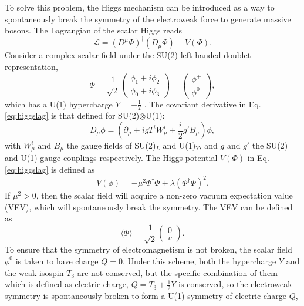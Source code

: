 \documentclass[a4paper,12pt]{article}
\begin{document}
To solve this problem, the Higgs mechanism can be introduced as a way to spontaneously break the symmetry of the electroweak force to generate massive bosons. 
The Lagrangian of the scalar Higgs reads
\begin{equation}
    \label{eq:higgslag}
    \mathcal{L} = (D^\mu\Phi)^\dagger(D_\mu\Phi) - V(\Phi).
\end{equation}
Consider a complex scalar field under the SU(2) left-handed doublet representation,
\begin{equation}
    \label{eq:doubscal}
    \Phi = \frac{1}{\sqrt{2}}\begin{pmatrix}\phi_1+i\phi_2\\\phi_0+i\phi_3\end{pmatrix} = \begin{pmatrix} \phi^+\\\phi^0\end{pmatrix},
\end{equation}
which has a U(1) hypercharge $Y=+\frac12$ \cite{l}.
The covariant derivative in Eq.\eqref{eq:higgslag} is that defined for SU(2)$\otimes$U(1):
\begin{equation}
    \label{eq:covarhiggs}
    D_\mu\phi = \left(\partial_\mu + igT^iW_\mu^i + \frac{i}{2}g'B_\mu\right)\phi,
\end{equation}
with $W^i_\mu$ and $B_\mu$ the gauge fields of SU(2)$_L$ and U(1)$_Y$, and $g$ and $g'$ the SU(2) and U(1) gauge couplings respectively. 
The Higgs potential $V(\Phi)$ in Eq.\eqref{eq:higgslag} is defined as
\begin{equation}
    \label{eq:goldpot}
    V(\phi) = -\mu^2\Phi^\dagger\Phi + \lambda(\Phi^\dagger\Phi)^2.
\end{equation}
If $\mu^2>0$, then the scalar field will acquire a non-zero vacuum expectation value (VEV), which will spontaneously break the symmetry. 
The VEV can be defined as
\begin{equation}
    \label{eq:vev}
    \langle\Phi\rangle = \frac{1}{\sqrt{2}}\begin{pmatrix}0\\v\end{pmatrix}.
\end{equation}
To ensure that the symmetry of electromagnetism is not broken, the scalar field $\phi^0$ is taken to have charge $Q=0$.
Under this scheme, both the hypercharge $Y$ and the weak isospin $T_3$ are not conserved, but the specific combination of them which is defined as electric charge, $Q=T_3+\frac12 Y$ is conserved, so the electroweak symmetry is spontaneously broken to form a U(1) symmetry of electric charge $Q$,
\end{document}
